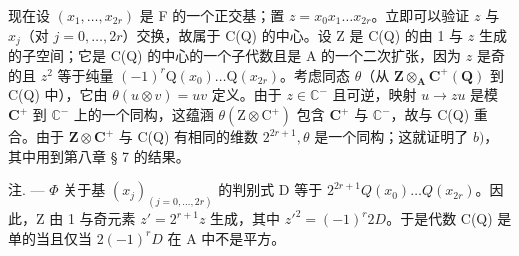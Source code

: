   现在设 \((x_{1},\ldots ,x_{2r})\) 是 F 的一个正交基；置 \(z = x_0x_1\dots x_{2r}\)。立即可以验证 \(z\) 与 \(x_{j}\)（对 \(j = 0,\dots,2r\)）交换，故属于 C(Q) 的中心。设 Z 是 C(Q) 的由 1 与 \(z\) 生成的子空间；它是 C(Q) 的中心的一个子代数且是 A 的一个二次扩张，因为 \(z\) 是奇的且 \(z^2\) 等于纯量 \((-1)^r\mathrm{Q}(x_0)\ldots \mathrm{Q}(x_{2r})\)。考虑同态 \(\theta\)（从 \(\mathbf{Z}\otimes_{\mathbf{A}}\mathbf{C}^{+}(\mathbf{Q})\) 到 C(Q) 中），它由 \(\theta (u\otimes v) = uv\) 定义。由于 \(z\in \mathbb{C}^{-}\) 且可逆，映射 \(u\to zu\) 是模 \(\mathbf{C}^+\) 到 \(\mathbb{C}^{-}\) 上的一个同构，这蕴涵 \(\theta (\mathrm{Z}\otimes \mathrm{C}^{+})\) 包含 \(\mathbf{C}^{+}\) 与 \(\mathbb{C}^{-}\)，故与 C(Q) 重合。由于 \(\mathbf{Z}\otimes \mathbf{C}^{+}\) 与 C(Q) 有相同的维数 \(2^{2r + 1},\theta\) 是一个同构；这就证明了 \(b)\)，其中用到第八章 § 7 的结果。

注. --- \(\Phi\) 关于基 \((x_{j})_{(j=0,\ldots,2r)}\) 的判别式 D 等于 \(2^{2r+1}Q(x_{0})\ldots Q(x_{2r})\)。因此，Z 由 1 与奇元素 \(z' = 2^{r+1}z\) 生成，其中 \(z'^{2} = (-1)^{r}2D\)。于是代数 C(Q) 是单的当且仅当 \(2(-1)^{r}D\) 在 A 中不是平方。
\relax{}
